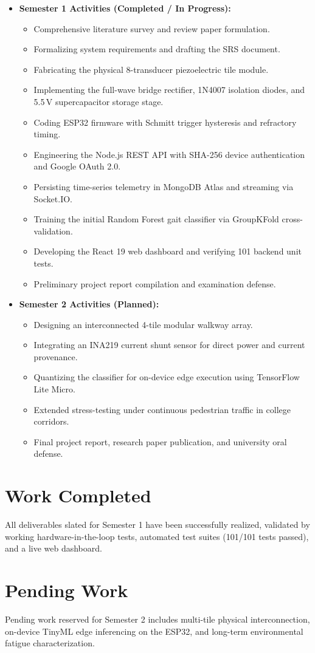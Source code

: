 \begin{itemize}
    \item \textbf{Semester 1 Activities (Completed / In Progress):}
    \begin{itemize}
        \item Comprehensive literature survey and review paper formulation.
        \item Formalizing system requirements and drafting the SRS document.
        \item Fabricating the physical 8-transducer piezoelectric tile module.
        \item Implementing the full-wave bridge rectifier, 1N4007 isolation diodes, and 5.5\,V supercapacitor storage stage.
        \item Coding ESP32 firmware with Schmitt trigger hysteresis and refractory timing.
        \item Engineering the Node.js REST API with SHA-256 device authentication and Google OAuth 2.0.
        \item Persisting time-series telemetry in MongoDB Atlas and streaming via Socket.IO.
        \item Training the initial Random Forest gait classifier via GroupKFold cross-validation.
        \item Developing the React 19 web dashboard and verifying 101 backend unit tests.
        \item Preliminary project report compilation and examination defense.
    \end{itemize}
    \item \textbf{Semester 2 Activities (Planned):}
    \begin{itemize}
        \item Designing an interconnected 4-tile modular walkway array.
        \item Integrating an INA219 current shunt sensor for direct power and current provenance.
        \item Quantizing the classifier for on-device edge execution using TensorFlow Lite Micro.
        \item Extended stress-testing under continuous pedestrian traffic in college corridors.
        \item Final project report, research paper publication, and university oral defense.
    \end{itemize}
\end{itemize}

\section{Work Completed}
All deliverables slated for Semester 1 have been successfully realized, validated by working hardware-in-the-loop tests, automated test suites (101/101 tests passed), and a live web dashboard.

\section{Pending Work}
Pending work reserved for Semester 2 includes multi-tile physical interconnection, on-device TinyML edge inferencing on the ESP32, and long-term environmental fatigue characterization.
